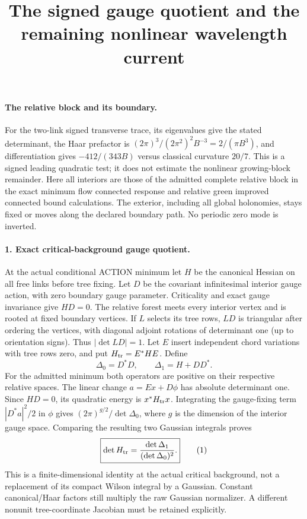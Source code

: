 \documentclass[11pt]{article}
\title{The signed gauge quotient and the remaining nonlinear wavelength current}\author{}\date{}
\begin{document}
\maketitle
\paragraph{The relative block and its boundary.}
For the two-link signed transverse trace,
its eigenvalues give the stated determinant, the Haar prefactor is
$(2\pi)^3/(2\pi^2)^2 B^{-3}=2/(\pi B^3)$, and differentiation gives
$-412/(343B)$ versus classical curvature $20/7$. This is a signed leading
quadratic test; it does not estimate the nonlinear growing-block remainder.
Here all interiors are those of the admitted complete relative block in
the exact minimum flow connected response and relative green improved connected bound calculations. The exterior, including all global holonomies, stays fixed or
moves along the declared boundary path. No periodic zero mode is inverted.

\paragraph{1. Exact critical-background gauge quotient.}
At the actual conditional ACTION minimum let $H$ be the canonical Hessian
on all free links before tree fixing. Let $D$ be the covariant infinitesimal
interior gauge action, with zero boundary gauge parameter. Criticality and
exact gauge invariance give $HD=0$. The relative forest meets every interior
vertex and is rooted at fixed boundary vertices. If $L$ selects its tree
rows, $LD$ is triangular after ordering the vertices, with diagonal adjoint
rotations of determinant one (up to orientation signs). Thus
$|\det LD|=1$. Let $E$ insert independent chord variations with tree rows zero,
and put $H_{\rm tr}=E^*HE$. Define
\[
 \Delta_0=D^*D,\qquad \Delta_1=H+DD^*.
\]
For the admitted minimum both operators are positive on their respective
relative spaces. The linear change $a=Ex+D\phi$ has absolute determinant
one. Since $HD=0$, its quadratic energy is $x^*H_{\rm tr}x$.
Integrating the gauge-fixing term $|D^*a|^2/2$ in $\phi$ gives
$(2\pi)^{g/2}/\det\Delta_0$, where $g$ is the dimension of the interior
gauge space. Comparing the resulting two Gaussian integrals proves
\[
 \boxed{\det H_{\rm tr}=\frac{\det\Delta_1}{(\det\Delta_0)^2}.}       \tag{1}
\]
This is a finite-dimensional identity at the actual critical background,
not a replacement of its compact Wilson integral by a Gaussian. Constant
canonical/Haar factors still multiply the raw Gaussian normalizer.
A different nonunit tree-coordinate Jacobian must be retained explicitly.
\end{document}
